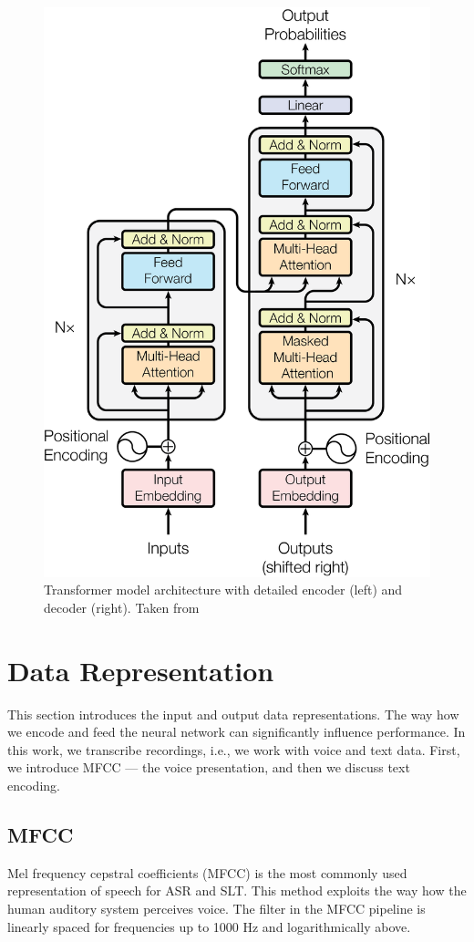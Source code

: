 \begin{figure}[]
	\centering
	\includegraphics[width=0.8\linewidth]{img/ModalNet-21.png}
	\caption[Transformer model architecture]{Transformer model architecture with detailed encoder (left) and decoder (right). Taken from }
	\label{fig:transformer}
\end{figure}





\pagebreak
\section{Data Representation}
This section introduces the input and output data representations. The way how we encode and feed the neural network can significantly influence performance. In this work, we transcribe recordings, i.e., we work with voice and text data. First, we introduce MFCC --- the voice presentation, and then we discuss text encoding.

\subsection{MFCC}
\label{mfcc}
Mel frequency cepstral coefficients (MFCC) is the most commonly used representation of speech for ASR and SLT. 
This method exploits the way how the human auditory system perceives voice. The filter in the MFCC pipeline is linearly spaced for frequencies up to 1000 Hz and logarithmically above. 

